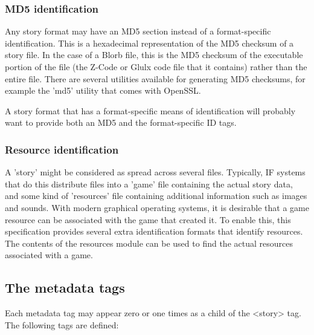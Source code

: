 \documentclass[a4paper,11pt]{article}
\begin{document}
\subsubsection{MD5 identification}

Any story format may have an MD5 section instead of a format-specific identification. 
This is a hexadecimal representation of the
MD5 checksum of a story file. In the case of a Blorb file, this is the MD5 checksum of
the executable portion of the file (the Z-Code or Glulx code file that it contains) rather
than the entire file. There are several utilities available for generating MD5 checksums,
for example the 'md5' utility that comes with OpenSSL.

A story format that has a format-specific means of identification will probably want to
provide both an MD5 and the format-specific ID tags.

\subsubsection{Resource identification}

A 'story' might be considered as spread across several files. Typically, IF systems that do
this distribute files into a 'game' file containing the actual story data, and some kind of
'resources' file containing additional information such as images and sounds. With modern
graphical operating systems, it is desirable that a game resource can be associated with the
game that created it. To enable this, this specification provides several extra identification
formats that identify resources. The contents of the resources module can be used to find
the actual resources associated with a game.

\subsection{The metadata tags}

Each metadata tag may appear zero or one times as a child of  the <story> tag. The following
tags are defined:
\end{document}

